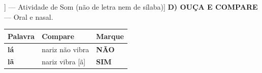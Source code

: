 \begin{exercicio}[Som /ã/ [[a~]] --- Atividade de Som (não de letra nem de sílaba)]
\textbf{D) OUÇA E COMPARE} --- Oral e nasal.

\begin{center}
\begin{tabular}{@{}p{4.2cm}p{6.2cm}p{1.6cm}@{}}
\hline
\textbf{Palavra} & \textbf{Compare} & \textbf{Marque} \\
\hline
\textbf{lá} & nariz não vibra & \textbf{NÃO} \\
\textbf{lã} & nariz vibra [ã] & \textbf{SIM} \\

\hline
\end{tabular}
\end{center}

\end{exercicio}

